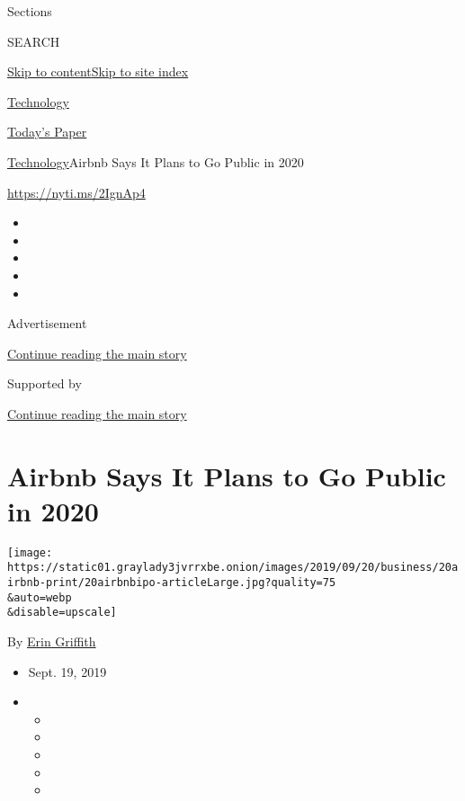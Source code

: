 Sections

SEARCH

\protect\hyperlink{site-content}{Skip to
content}\protect\hyperlink{site-index}{Skip to site index}

\href{https://www.nytimes3xbfgragh.onion/section/technology}{Technology}

\href{https://myaccount.nytimes3xbfgragh.onion/auth/login?response_type=cookie\&client_id=vi}{}

\href{https://www.nytimes3xbfgragh.onion/section/todayspaper}{Today's
Paper}

\href{/section/technology}{Technology}\textbar{}Airbnb Says It Plans to
Go Public in 2020

\url{https://nyti.ms/2IgnAp4}

\begin{itemize}
\item
\item
\item
\item
\item
\end{itemize}

Advertisement

\protect\hyperlink{after-top}{Continue reading the main story}

Supported by

\protect\hyperlink{after-sponsor}{Continue reading the main story}

\hypertarget{airbnb-says-it-plans-to-go-public-in-2020}{%
\section{Airbnb Says It Plans to Go Public in
2020}\label{airbnb-says-it-plans-to-go-public-in-2020}}

\texttt{[image: https://static01.graylady3jvrrxbe.onion/images/2019/09/20/business/20airbnb-print/20airbnbipo-articleLarge.jpg?quality=75\\\&auto=webp\\\&disable=upscale]}

By \href{https://www.nytimes3xbfgragh.onion/by/erin-griffith}{Erin
Griffith}

\begin{itemize}
\item
  Sept. 19, 2019
\item
  \begin{itemize}
  \item
  \item
  \item
  \item
  \item
  \end{itemize}
\end{itemize}

